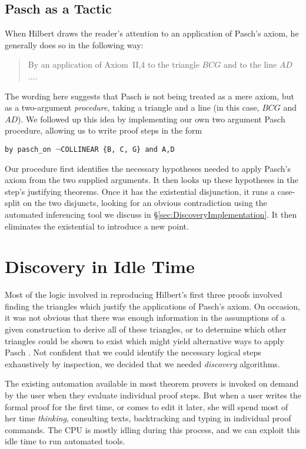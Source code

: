 \subsection{Pasch as a Tactic}
When Hilbert draws the reader's attention to an application of Pasch's axiom, he generally does so in the following way:
\begin{quote}By an application of Axiom~II,4 to the triangle $BCG$ and to the line $AD$....\end{quote}

The wording here suggests that Pasch is not being treated as a mere axiom, but as a two-argument \emph{procedure}, taking a triangle and a line (in this case, $BCG$ and $AD$). We followed up this idea by implementing our own two argument Pasch procedure, allowing us to write proof steps in the form

\vspace{0.5cm}
\texttt{\qquad\qquad by pasch\_on $\neg$COLLINEAR \{B, C, G\} and A,D}
\vspace{0.5cm}

Our procedure first identifies the necessary hypotheses needed to apply Pasch's axiom from the two supplied arguments. It then looks up these hypotheses in the step's justifying theorems. Once it has the existential disjunction, it runs a case-split on the two disjuncts, looking for an obvious contradiction using the automated inferencing tool we discuss in \S\ref{sec:DiscoveryImplementation}. It then eliminates the existential to introduce a new point.

\section{Discovery in Idle Time}
Most of the logic involved in reproducing Hilbert's first three proofs involved finding the triangles which justify the applications of Pasch's axiom. On occasion, it was not obvious that there was enough information in the assumptions of a given construction to derive all of these triangles, or to determine which other triangles could be shown to exist which might yield alternative ways to apply Pasch . Not confident that we could identify the necessary logical steps exhaustively by inspection, we decided that we needed \emph{discovery} algorithms. 

The existing automation available in most theorem provers is invoked on demand by the user when they evaluate individual proof steps. But when a user writes the formal proof for the first time, or comes to edit it later, she will spend most of her time \emph{thinking}, consulting texts, backtracking and typing in individual proof commands. The CPU is mostly idling during this process, and we can exploit this idle time to run automated tools. 

